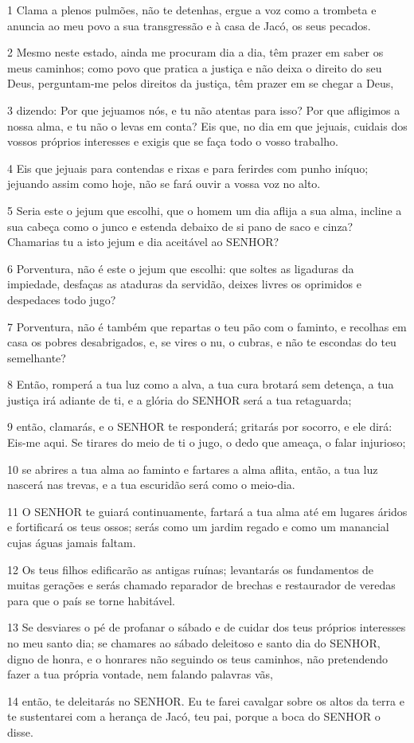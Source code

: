 \par 1 Clama a plenos pulmões, não te detenhas, ergue a voz como a trombeta e anuncia ao meu povo a sua transgressão e à casa de Jacó, os seus pecados.
\par 2 Mesmo neste estado, ainda me procuram dia a dia, têm prazer em saber os meus caminhos; como povo que pratica a justiça e não deixa o direito do seu Deus, perguntam-me pelos direitos da justiça, têm prazer em se chegar a Deus,
\par 3 dizendo: Por que jejuamos nós, e tu não atentas para isso? Por que afligimos a nossa alma, e tu não o levas em conta? Eis que, no dia em que jejuais, cuidais dos vossos próprios interesses e exigis que se faça todo o vosso trabalho.
\par 4 Eis que jejuais para contendas e rixas e para ferirdes com punho iníquo; jejuando assim como hoje, não se fará ouvir a vossa voz no alto.
\par 5 Seria este o jejum que escolhi, que o homem um dia aflija a sua alma, incline a sua cabeça como o junco e estenda debaixo de si pano de saco e cinza? Chamarias tu a isto jejum e dia aceitável ao SENHOR?
\par 6 Porventura, não é este o jejum que escolhi: que soltes as ligaduras da impiedade, desfaças as ataduras da servidão, deixes livres os oprimidos e despedaces todo jugo?
\par 7 Porventura, não é também que repartas o teu pão com o faminto, e recolhas em casa os pobres desabrigados, e, se vires o nu, o cubras, e não te escondas do teu semelhante?
\par 8 Então, romperá a tua luz como a alva, a tua cura brotará sem detença, a tua justiça irá adiante de ti, e a glória do SENHOR será a tua retaguarda;
\par 9 então, clamarás, e o SENHOR te responderá; gritarás por socorro, e ele dirá: Eis-me aqui. Se tirares do meio de ti o jugo, o dedo que ameaça, o falar injurioso;
\par 10 se abrires a tua alma ao faminto e fartares a alma aflita, então, a tua luz nascerá nas trevas, e a tua escuridão será como o meio-dia.
\par 11 O SENHOR te guiará continuamente, fartará a tua alma até em lugares áridos e fortificará os teus ossos; serás como um jardim regado e como um manancial cujas águas jamais faltam.
\par 12 Os teus filhos edificarão as antigas ruínas; levantarás os fundamentos de muitas gerações e serás chamado reparador de brechas e restaurador de veredas para que o país se torne habitável.
\par 13 Se desviares o pé de profanar o sábado e de cuidar dos teus próprios interesses no meu santo dia; se chamares ao sábado deleitoso e santo dia do SENHOR, digno de honra, e o honrares não seguindo os teus caminhos, não pretendendo fazer a tua própria vontade, nem falando palavras vãs,
\par 14 então, te deleitarás no SENHOR. Eu te farei cavalgar sobre os altos da terra e te sustentarei com a herança de Jacó, teu pai, porque a boca do SENHOR o disse.

